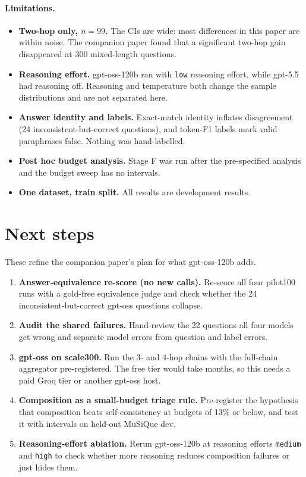 \documentclass[11pt]{article}
\newcommand{\code}[1]{\texttt{#1}}
\begin{document}
\paragraph{Limitations.}
\begin{itemize}
  \item \textbf{Two-hop only, $n = 99$.} The CIs are wide: most differences in this paper
        are within noise. The companion paper found that a significant two-hop gain
        disappeared at 300 mixed-length questions.
  \item \textbf{Reasoning effort.} gpt-oss-120b ran with \code{low} reasoning effort, while
        gpt-5.5 had reasoning off. Reasoning and temperature both change the sample
        distributions and are not separated here.
  \item \textbf{Answer identity and labels.} Exact-match identity inflates disagreement
        (24 inconsistent-but-correct questions), and token-F1 labels mark valid
        paraphrases false. Nothing was hand-labelled.
  \item \textbf{Post hoc budget analysis.} Stage F was run after the pre-specified analysis
        and the budget sweep has no intervals.
  \item \textbf{One dataset, train split.} All results are development results.
\end{itemize}

\section{Next steps}

These refine the companion paper's plan for what gpt-oss-120b adds.
\begin{enumerate}
  \item \textbf{Answer-equivalence re-score (no new calls).} Re-score all four pilot100
        runs with a gold-free equivalence judge and check whether the 24
        inconsistent-but-correct gpt-oss questions collapse.
  \item \textbf{Audit the shared failures.} Hand-review the 22 questions all four models
        get wrong and separate model errors from question and label errors.
  \item \textbf{gpt-oss on scale300.} Run the 3- and 4-hop chains with the full-chain
        aggregator pre-registered. The free tier would take months, so this needs a paid
        Groq tier or another gpt-oss host.
  \item \textbf{Composition as a small-budget triage rule.} Pre-register the hypothesis that
        composition beats self-consistency at budgets of 13\% or below, and test it with
        intervals on held-out MuSiQue dev.
  \item \textbf{Reasoning-effort ablation.} Rerun gpt-oss-120b at reasoning efforts
        \code{medium} and \code{high} to check whether more reasoning reduces
        composition failures or just hides them.
\end{enumerate}
\end{document}

